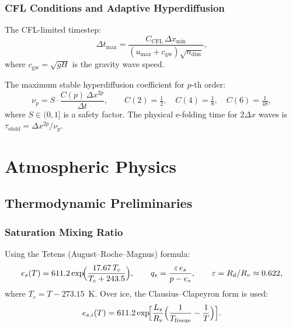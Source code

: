 \documentclass[11pt,twoside]{report}
\newcommand{\Rd}{R_d}
\newcommand{\Ls}{L_s}
\newcommand{\Rv}{R_v}
\begin{document}
\subsection{CFL Conditions and Adaptive Hyperdiffusion}

The CFL-limited timestep:
\begin{equation}
  \Delta t_{\max} = \frac{C_{\mathrm{CFL}}\,\Delta x_{\min}}
  {(u_{\max}+c_{\mathrm{gw}})\sqrt{n_{\mathrm{dim}}}},
\end{equation}
where $c_{\mathrm{gw}}=\sqrt{gH}$ is the gravity wave speed.

The maximum stable hyperdiffusion coefficient for $p$-th order:
\begin{equation}
  \nu_p = S\cdot\frac{C(p)\,\Delta x^{2p}}{\Delta t},
  \qquad
  C(2)=\tfrac{1}{2},\quad C(4)=\tfrac{1}{8},\quad C(6)=\tfrac{1}{48},
\end{equation}
where $S\in(0,1]$ is a safety factor.  The physical e-folding time for
$2\Delta x$ waves is $\tau_{\mathrm{efold}} = \Delta x^{2p}/\nu_p$.


\chapter{Atmospheric Physics}
\label{ch:physics}

\section{Thermodynamic Preliminaries}
\label{sec:thermo}

\subsection{Saturation Mixing Ratio}

Using the Tetens (August--Roche--Magnus) formula:
\begin{equation}
  e_s(T) = 611.2\exp\!\Bigl(\frac{17.67\,T_c}{T_c+243.5}\Bigr),
  \qquad q_s = \frac{\varepsilon\,e_s}{p-e_s},
  \qquad \varepsilon=\Rd/\Rv\approx 0.622,
\end{equation}
where $T_c = T - 273.15$~K.  Over ice, the Clausius--Clapeyron form is
used:
\begin{equation}
  e_{s,i}(T) = 611.2\exp\!\Bigl[\frac{\Ls}{\Rv}
  \Bigl(\frac{1}{T_{\mathrm{freeze}}}-\frac{1}{T}\Bigr)\Bigr].
\end{equation}
\end{document}
